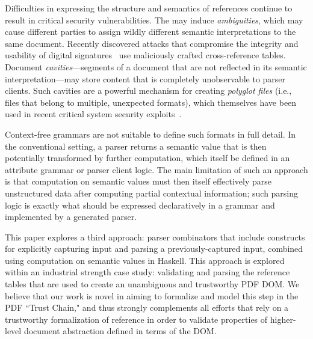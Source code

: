Difficulties in expressing the structure and semantics of references
continue to result in critical security vulnerabilities.
%
The may induce \emph{ambiguities}, which may cause different parties
to assign wildly different semantic interpretations to the same
document.
%
Recently discovered attacks that compromise the integrity and
usability of digital
signatures~\cite{rohlmannBreakingSpecificationPDF2021,
  mainkaShadowAttacksHiding2021} use maliciously crafted
cross-reference tables.
%
Document \emph{cavities}---segments of a document that are not
reflected in its semantic interpretation---may store content that is
completely unobservable to parser clients.
%
Such cavities are a powerful mechanism for creating \emph{polyglot
  files} (i.e., files that belong to multiple, unexpected formats),
which themselves have been used in recent critical system security
exploits~\cite{psychicPaper}.

Context-free grammars are not suitable to define such formats in full
detail.
%
In the conventional setting, a parser returns a semantic value that is
then potentially transformed by further computation, which itself be
defined in an attribute grammar or parser client logic.
%
The main limitation of such an approach is that computation on
semantic values must then itself effectively parse unstructured data
after computing partial contextual information;
%
such parsing logic is exactly what should be expressed declaratively
in a grammar and implemented by a generated parser.

This paper explores a third approach: parser combinators that include
constructs for explicitly capturing input and parsing a
previously-captured input, combined using computation on semantic
values in Haskell.
%
This approach is explored within an industrial strength case study:
validating and parsing the reference tables that are used to create 
an unambiguous and trustworthy PDF DOM.
%
We believe that our work is novel in aiming to formalize and model
this step in the PDF ``Trust Chain," and thus strongly complements all
efforts that rely on a trustworthy formalization of reference in order
to validate properties of higher-level document abstraction defined in
terms of the DOM.

